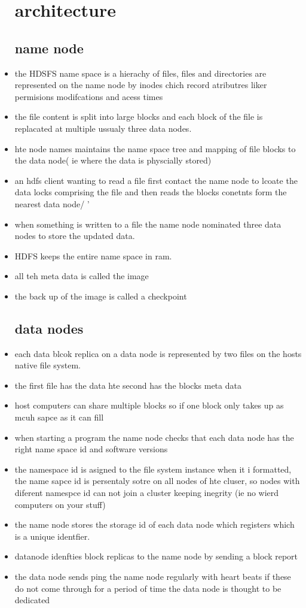 \documentclass{article}
\begin{document}
\begin{itemize}
\section*{architecture }
\subsection*{name node}
\item the HDSFS name space is a hierachy of files, files and directories are represented on the name node by inodes chich record atributres liker permisions modifcations and acess times 
\item the file content is split into large blocks and each block of the file is replacated at multiple ussualy three data nodes. 
\item hte node names maintains the name space tree and mapping of file blocks to the data node( ie where the data is physcially stored)
\item an hdfs client wanting to read a file first contact the name node to lcoate the data locks comprising the file and then reads the blocks conetnts form the nearest data node/ '
\item when something is written to a file the name node nominated three data nodes to store the updated data. 
\item HDFS keeps the entire name space in ram. 
\item all teh meta data is called the image 
\item the back up of the image is called a checkpoint 
\subsection*{data nodes }
\item each data blcok replica on a data node is represented by two files on the hosts native file system.
\item the first file has the data hte second has the blocks meta data 
\item host computers can share multiple blocks so if one block only takes up as mcuh sapce as it can fill
\item when starting a program the name node checks that each data node has the right name space id and software versions 
\item the namespace id is asigned to the file system instance when it i formatted, the name sapce id is persentaly sotre on all nodes of hte cluser, so nodes with diferent namespce id can not join a cluster keeping inegrity (ie no wierd computers on your stuff)
\item the name node stores the storage id of each data node which registers which is a unique identfier. 
\item datanode idenfties block replicas to the name node by sending a block report
\item the data node sends ping the name node regularly with heart beats if these do not come through for a period of time the data node is thought to be dedicated

\end{itemize}
\end{document}
